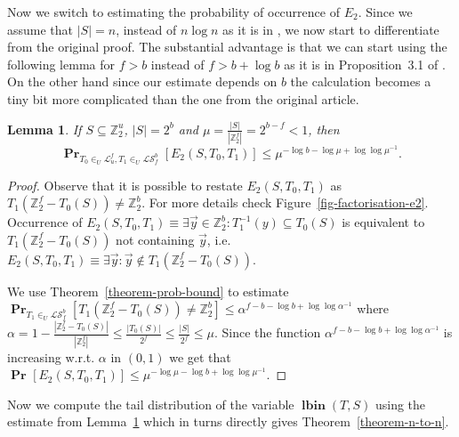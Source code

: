 \documentclass{article}
\newcommand{\lbin}[2]{\operatorname{\mathbf{lbin}}({#1}, {#2})}
\newcommand{\vecspace}[2]{\mathbb{Z}_{#1}^{#2}}
\newcommand{\binvecspace}[1]{\vecspace{2}{#1}}
\newcommand{\linearmaps}[2]{\mathcal{L}_{#1}^{#2}}
\newcommand{\surjectivelinearmaps}[2]{\mathcal{LS}_{#1}^{#2}}
\newcommand{\probs}[2]{\operatorname{\mathbf{Pr}}_{{#1}}\left[{#2}\right]}
\newcommand{\prob}[1]{\probs{}{#1}}
\newtheorem{lemma}{Lemma}
\begin{document}
Now we switch to estimating the probability of occurrence of $E_2$. 
Since we assume that $|S| = n$, instead of $n \log n$ as it is in \cite{alonetal}, we now start to differentiate from the original proof.
The substantial advantage is that we can start using the following lemma for $f > b$ instead of $f > b + \log b$ as it is in Proposition~3.1 of \cite{alonetal}.
On the other hand since our estimate depends on $b$ the calculation becomes a tiny bit more complicated than the one from the original article.

\begin{lemma}
\label{lemma-bound}
If $S \subseteq \binvecspace{u}$, $|S| = 2^b$ and $\mu = \frac{|S|}{|\binvecspace{f}|} = 2^{b - f} < 1$, then
\[
\probs{T_0 \in_U \linearmaps{u}{f}, T_1 \in_U \surjectivelinearmaps{f}{b}}{E_2(S, T_0, T_1)} \leq \mu ^ {-\log b - \log \mu + \log \log \mu^{-1}}.
\]
\end{lemma}
\begin{proof}
Observe that it is possible to restate $E_2(S, T_0, T_1)$ as $T_1(\binvecspace{f} - T_0(S)) \neq \binvecspace{b}$. 
For more details check Figure~\ref{fig-factorisation-e2}.
Occurrence of $E_2(S, T_0, T_1) \equiv \exists \vec{y} \in \binvecspace{b} \colon T_1^{-1}(y) \subseteq T_0(S)$ is equivalent to $T_1(\binvecspace{f} - T_0(S))$ not containing $\vec{y}$, i.e. $E_2(S, T_0, T_1) \equiv \exists \vec{y} \colon \vec{y} \not\in T_1(\binvecspace{f} - T_0(S))$.

We use Theorem~\ref{theorem-prob-bound} to estimate $\probs{T_1\in_U \surjectivelinearmaps{f}{b}}{T_1(\binvecspace{f} - T_0(S)) \neq \binvecspace{b}} \leq \alpha ^ {f - b - \log b + \log \log \alpha^{-1}}$ where $\alpha = 1 - \frac{|\binvecspace{f} - T_0(S)|}{|\binvecspace{f}|} \leq \frac{|T_0(S)|}{2^f} \leq \frac{|S|}{2^f} \leq \mu$.
Since the function $\alpha ^ {f - b - \log b + \log \log \alpha^{-1}}$ is increasing w.r.t. $\alpha$ in $(0, 1)$ we get that
$
\prob{E_2(S, T_0, T_1)} \leq \mu ^ {-\log \mu - \log b + \log \log \mu^{-1}}.
$
\end{proof} 

Now we compute the tail distribution of the variable $\lbin{T}{S}$ using the estimate from Lemma~\ref{lemma-bound} which in turns directly gives Theorem~\ref{theorem-n-to-n}.
\end{document}
